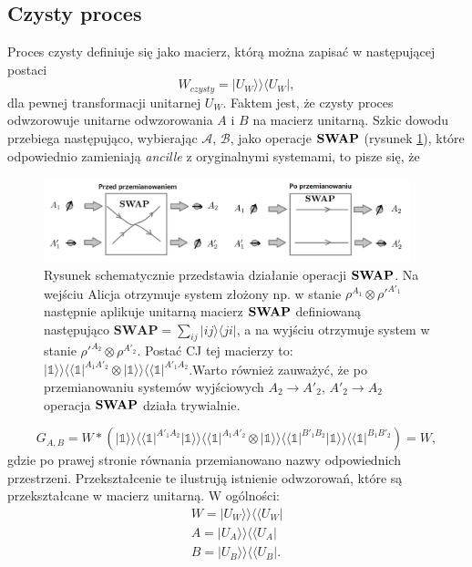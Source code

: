 \documentclass[10pt]{article} %
\newcommand{\Ket}[1]{|#1\rangle}
\newcommand{\Bra}[1]{\langle#1|}
\newcommand{\BBra}[1]{\langle\langle#1|}
\newcommand{\KKet}[1]{|#1\rangle\rangle}
\newcommand{\I}{\mathbb{1}}
\begin{document}
\subsection{Czysty proces}
Proces czysty definiuje się jako macierz, którą można zapisać w następującej postaci
\begin{equation}
W_{czysty} = \KKet{U_W}\Bra{U_W},
\end{equation} dla pewnej transformacji unitarnej $U_W$. Faktem jest, że czysty proces odwzorowuje unitarne odwzorowania $A$ i $B$ na macierz unitarną. Szkic dowodu przebiega następująco,
wybierając $\mathcal{A}$, $\mathcal{B}$, jako operacje $\bf{SWAP}$ (rysunek \ref{swap}), które odpowiednio zamieniają \textit{ancille} z oryginalnymi systemami, to pisze się, że
\begin{figure}[t]
\centering
\includegraphics[width=0.95\textwidth]{obrazki/swap}
\caption{Rysunek schematycznie przedstawia działanie operacji $\bf{SWAP}$. Na wejściu Alicja otrzymuje system złożony np. w stanie $\rho^{A_1} \otimes \rho'^{A'_1}$ następnie aplikuje unitarną macierz $\bf{SWAP}$ definiowaną następująco $\textbf{SWAP} = \sum_{ij} \Ket{ij}\Bra{ji}$, a na wyjściu otrzymuje system w stanie $\rho'^{A_2} \otimes \rho^{A'_2}$. Postać CJ tej macierzy to: $\KKet{\I}\BBra{\I}^{A_1A'_2} \otimes \KKet{\I}\BBra{\I}^{A'_1A_2}$.Warto również zauważyć, że po przemianowaniu systemów wyjściowych $A_2 \to A'_2$, $A'_2 \to A_2$ operacja $\bf{SWAP}$ działa trywialnie.}
\label{swap}
\end{figure}
\begin{equation}
G_{A,B} = W * \left( \KKet{\I}\BBra{\I}^{A'_1 A_2} \KKet{\I}\BBra{\I}^{A_1A'_2} \otimes \KKet{\I}\BBra{\I}^{B'_1 B_2} \KKet{\I}\BBra{\I}^{B_1B'_2}\right) = W,
\end{equation}
gdzie po prawej stronie równania przemianowano nazwy odpowiednich przestrzeni. Przekształcenie te ilustrują istnienie odwzorowań, które są przekształcane w macierz unitarną. W ogólności:
\begin{gather}
W = \KKet{U_W}\BBra{U_W} \\
A = \KKet{U_A}\BBra{U_A} \\
B = \KKet{U_B}\BBra{U_B}.
\end{gather}
\end{document}
